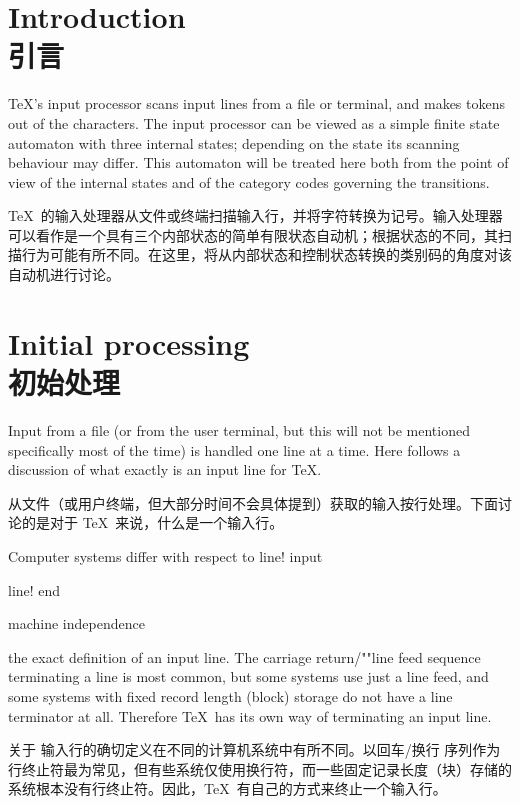 \section{Introduction\\引言}

\TeX's input processor scans input lines from a file or terminal, and
makes tokens out of the characters.
The input processor can be viewed as
a simple finite state automaton with three internal states; 
depending on the state its scanning behaviour may differ.
This automaton will be treated here both from the point of view of the
internal states and of the category codes governing the
transitions.

\TeX\ 的输入处理器从文件或终端扫描输入行，并将字符转换为记号。输入处理器可以看作是一个具有三个内部状态的简单有限状态自动机；根据状态的不同，其扫描行为可能有所不同。在这里，将从内部状态和控制状态转换的类别码的角度对该自动机进行讨论。


\section{Initial processing\\初始处理}

Input from a file (or from the user terminal, but this
will not be mentioned specifically
most of the time) is handled one line at a time.
Here follows a discussion of what exactly is an input line
for \TeX.

从文件（或用户终端，但大部分时间不会具体提到）获取的输入按行处理。下面讨论的是对于 \TeX\ 来说，什么是一个输入行。



Computer systems differ with respect to 
\term line! input\par\term line! end\par\term machine independence\par
the exact definition of an input
\mdqon
line. The carriage return/""line feed
\mdqoff
\awp
{}%
sequence terminating a line is most common,
but some systems use just a line feed, and
some systems with fixed record length (block) storage do not have
a line terminator at all. Therefore \TeX\ has its
own way of terminating an input line. 

关于%
输入行的确切定义在不同的计算机系统中有所不同。以回车/换行\mdqon
序列作为行终止符最为常见，但有些系统仅使用换行符，而一些固定记录长度（块）存储的系统根本没有行终止符。因此，\TeX\ 有自己的方式来终止一个输入行。

